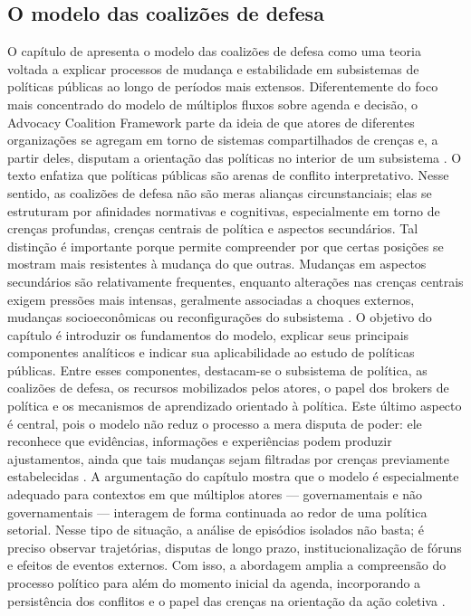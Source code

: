 \documentclass[12pt,a4paper]{article}
\begin{document}
\subsection{O modelo das coalizões de defesa}
\label{sec:org0210909}
O capítulo de \textcite{araujoSilva2022coalizoes} apresenta o modelo das coalizões de defesa como uma teoria voltada a explicar processos de mudança e estabilidade em subsistemas de políticas públicas ao longo de períodos mais extensos. Diferentemente do foco mais concentrado do modelo de múltiplos fluxos sobre agenda e decisão, o Advocacy Coalition Framework parte da ideia de que atores de diferentes organizações se agregam em torno de sistemas compartilhados de crenças e, a partir deles, disputam a orientação das políticas no interior de um subsistema \autocites{araujoSilva2022coalizoes}{sabatier1999theories}.
O texto enfatiza que políticas públicas são arenas de conflito interpretativo. Nesse sentido, as coalizões de defesa não são meras alianças circunstanciais; elas se estruturam por afinidades normativas e cognitivas, especialmente em torno de crenças profundas, crenças centrais de política e aspectos secundários. Tal distinção é importante porque permite compreender por que certas posições se mostram mais resistentes à mudança do que outras. Mudanças em aspectos secundários são relativamente frequentes, enquanto alterações nas crenças centrais exigem pressões mais intensas, geralmente associadas a choques externos, mudanças socioeconômicas ou reconfigurações do subsistema \autocite{araujoSilva2022coalizoes}.
O objetivo do capítulo é introduzir os fundamentos do modelo, explicar seus principais componentes analíticos e indicar sua aplicabilidade ao estudo de políticas públicas. Entre esses componentes, destacam-se o subsistema de política, as coalizões de defesa, os recursos mobilizados pelos atores, o papel dos brokers de política e os mecanismos de aprendizado orientado à política. Este último aspecto é central, pois o modelo não reduz o processo a mera disputa de poder: ele reconhece que evidências, informações e experiências podem produzir ajustamentos, ainda que tais mudanças sejam filtradas por crenças previamente estabelecidas \autocite{araujoSilva2022coalizoes}.
A argumentação do capítulo mostra que o modelo é especialmente adequado para contextos em que múltiplos atores — governamentais e não governamentais — interagem de forma continuada ao redor de uma política setorial. Nesse tipo de situação, a análise de episódios isolados não basta; é preciso observar trajetórias, disputas de longo prazo, institucionalização de fóruns e efeitos de eventos externos. Com isso, a abordagem amplia a compreensão do processo político para além do momento inicial da agenda, incorporando a persistência dos conflitos e o papel das crenças na orientação da ação coletiva \autocite{araujoSilva2022coalizoes}.
\end{document}
